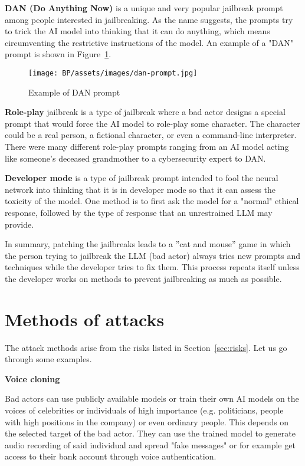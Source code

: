 \textbf{DAN (Do Anything Now)} is a unique and very popular jailbreak prompt among people interested in jailbreaking. As the name suggests, the prompts try to trick the AI model into thinking that it can do anything, which means circumventing the restrictive instructions of the model. An example of a "DAN" prompt is shown in Figure~\ref{fig:dan-prompt}.

\begin{figure}[ht]
\begin{centering}
\texttt{[image: BP/assets/images/dan-prompt.jpg]}
\par\end{centering}
\caption{Example of 
 DAN prompt\cite{reddit_pic}
 \label{fig:dan-prompt}}
\end{figure}


\textbf{Role-play} jailbreak is a type of jailbreak where a bad actor designs a special prompt that would force the AI model to role-play some character. The character could be a real person, a fictional character, or even a command-line interpreter. There were many different role-play prompts ranging from an AI model acting like someone's deceased grandmother to a cybersecurity expert to DAN.

\textbf{Developer mode} is a type of jailbreak prompt intended to fool the neural network into thinking that it is in developer mode so that it can assess the toxicity of the model. One method is to first ask the model for a "normal" ethical response, followed by the type of response that an unrestrained LLM may provide.

In summary, patching the jailbreaks leads to a ''cat and mouse'' game in which the person trying to jailbreak the LLM (bad actor) always tries new prompts and techniques while the developer tries to fix them. This process repeats itself unless the developer works on methods to prevent jailbreaking as much as possible.

\section{Methods of attacks}
The attack methods arise from the risks listed in Section~\ref{sec:risks}. Let us go through some examples.

\textbf{Voice cloning}

Bad actors can use publicly available models or train their own AI models on the voices of celebrities or individuals of high importance (e.g. politicians, people with high positions in the company) or even ordinary people. This depends on the selected target of the bad actor. They can use the trained model to generate audio recording of said individual and spread "fake messages" or for example get access to their bank account through voice authentication.

